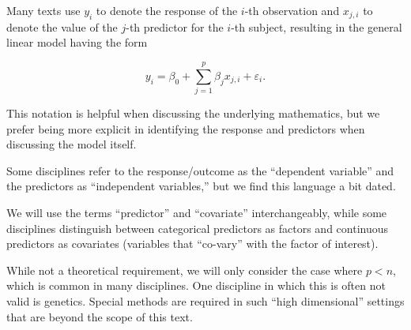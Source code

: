 \documentclass[
  letterpaper,
  DIV=11,
  numbers=noendperiod]{scrreprt}
\theoremstyle{definition}
\theoremstyle{definition}
\theoremstyle{remark}
\begin{document}
\begin{tcolorbox}[enhanced jigsaw, bottomrule=.15mm, titlerule=0mm, bottomtitle=1mm, colback=white, coltitle=black, rightrule=.15mm, leftrule=.75mm, toprule=.15mm, toptitle=1mm, left=2mm, opacityback=0, colframe=quarto-callout-note-color-frame, breakable, title=\textcolor{quarto-callout-note-color}{\faInfo}\hspace{0.5em}{Note}, arc=.35mm, colbacktitle=quarto-callout-note-color!10!white, opacitybacktitle=0.6]

Many texts use \(y_i\) to denote the response of the \(i\)-th
observation and \(x_{j,i}\) to denote the value of the \(j\)-th
predictor for the \(i\)-th subject, resulting in the general linear
model having the form

\[y_i = \beta_0 + \sum\limits_{j=1}^{p} \beta_j x_{j, i} + \varepsilon_i.\]

This notation is helpful when discussing the underlying mathematics, but
we prefer being more explicit in identifying the response and predictors
when discussing the model itself.

\end{tcolorbox}

\begin{tcolorbox}[enhanced jigsaw, bottomrule=.15mm, titlerule=0mm, bottomtitle=1mm, colback=white, coltitle=black, rightrule=.15mm, leftrule=.75mm, toprule=.15mm, toptitle=1mm, left=2mm, opacityback=0, colframe=quarto-callout-note-color-frame, breakable, title=\textcolor{quarto-callout-note-color}{\faInfo}\hspace{0.5em}{Note}, arc=.35mm, colbacktitle=quarto-callout-note-color!10!white, opacitybacktitle=0.6]

Some disciplines refer to the response/outcome as the ``dependent
variable'' and the predictors as ``independent variables,'' but we find
this language a bit dated.

We will use the terms ``predictor'' and ``covariate'' interchangeably,
while some disciplines distinguish between categorical predictors as
factors and continuous predictors as covariates (variables that
``co-vary'' with the factor of interest).

\end{tcolorbox}

\begin{tcolorbox}[enhanced jigsaw, bottomrule=.15mm, titlerule=0mm, bottomtitle=1mm, colback=white, coltitle=black, rightrule=.15mm, leftrule=.75mm, toprule=.15mm, toptitle=1mm, left=2mm, opacityback=0, colframe=quarto-callout-note-color-frame, breakable, title=\textcolor{quarto-callout-note-color}{\faInfo}\hspace{0.5em}{Note}, arc=.35mm, colbacktitle=quarto-callout-note-color!10!white, opacitybacktitle=0.6]

While not a theoretical requirement, we will only consider the case
where \(p < n\), which is common in many disciplines. One discipline in
which this is often not valid is genetics. Special methods are required
in such ``high dimensional'' settings that are beyond the scope of this
text.

\end{tcolorbox}
\end{document}

